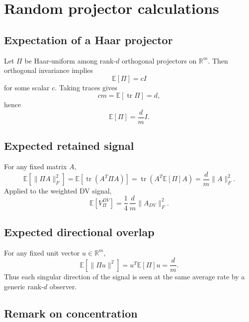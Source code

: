 \documentclass[11pt,a4paper]{article}
\numberwithin{equation}{section}
\theoremstyle{thmcompact}
\theoremstyle{remark}
\begin{document}
\section{Random projector calculations}
\label{app:random_projector_calculations}

\subsection{Expectation of a Haar projector}

Let \(\Pi\) be Haar-uniform among rank-\(d\) orthogonal projectors on \(\mathbb R^m\). Then orthogonal invariance implies
\begin{equation}
\mathbb E[\Pi]=cI
\end{equation}
for some scalar \(c\). Taking traces gives
\begin{equation}
cm=\mathbb E[\operatorname{tr}\Pi]=d,
\end{equation}
hence
\begin{equation}
\mathbb E[\Pi]=\frac{d}{m}I.
\end{equation}

\subsection{Expected retained signal}

For any fixed matrix \(A\),
\begin{equation}
\mathbb E[\|\Pi A\|_F^2]
=
\mathbb E[\operatorname{tr}(A^T\Pi A)]
=
\operatorname{tr}(A^T \mathbb E[\Pi] A)
=
\frac{d}{m}\|A\|_F^2.
\end{equation}
Applied to the weighted DV signal,
\begin{equation}
\mathbb E[V_\Pi^{DV}]
=
\frac14\,\frac{d}{m}\|A_{DV}\|_F^2.
\end{equation}

\subsection{Expected directional overlap}

For any fixed unit vector \(u\in\mathbb R^m\),
\begin{equation}
\mathbb E[\|\Pi u\|^2]=u^T\mathbb E[\Pi]u=\frac{d}{m}.
\end{equation}
Thus each singular direction of the signal is seen at the same average rate by a generic rank-\(d\) observer.

\subsection{Remark on concentration}
\end{document}
